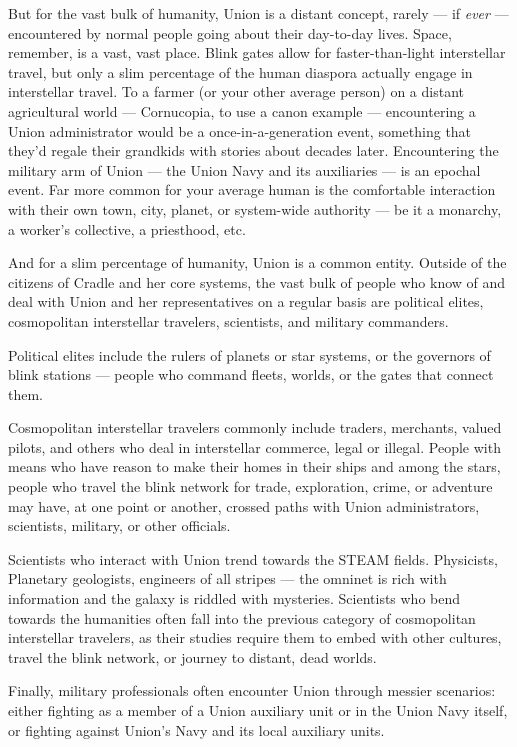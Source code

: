 But for the vast bulk of humanity, Union is a distant concept, rarely — if \textit{ever} — encountered by
normal people going about their day-to-day lives. Space, remember, is a vast, vast place. Blink
gates allow for faster-than-light interstellar travel, but only a slim percentage of the human
diaspora actually engage in interstellar travel. To a farmer (or your other average person) on a
distant agricultural world — Cornucopia, to use a canon example — encountering a Union
administrator would be a once-in-a-generation event, something that they’d regale their
grandkids with stories about decades later. Encountering the military arm of Union — the Union
Navy and its auxiliaries — is an epochal event. Far more common for your average human is the
comfortable interaction with their own town, city, planet, or system-wide authority — be it a
monarchy, a worker’s collective, a priesthood, etc.

And for a slim percentage of humanity, Union is a common entity. Outside of the citizens of
Cradle and her core systems, the vast bulk of people who know of and deal with Union and her
representatives on a regular basis are political elites, cosmopolitan interstellar travelers,
scientists, and military commanders.

Political elites include the rulers of planets or star systems, or the governors of blink stations —
people who command fleets, worlds, or the gates that connect them.

Cosmopolitan interstellar travelers commonly include traders, merchants, valued pilots, and
others who deal in interstellar commerce, legal or illegal. People with means who have reason to
make their homes in their ships and among the stars, people who travel the blink network for
trade, exploration, crime, or adventure may have, at one point or another, crossed paths with
Union administrators, scientists, military, or other officials.

Scientists who interact with Union trend towards the STEAM fields. Physicists, Planetary
geologists, engineers of all stripes — the omninet is rich with information and the galaxy is
riddled with mysteries. Scientists who bend towards the humanities often fall into the previous
category of cosmopolitan interstellar travelers, as their studies require them to embed with other
cultures, travel the blink network, or journey to distant, dead worlds.

Finally, military professionals often encounter Union through messier scenarios: either fighting as
a member of a Union auxiliary unit or in the Union Navy itself, or fighting against Union’s Navy
and its local auxiliary units.

